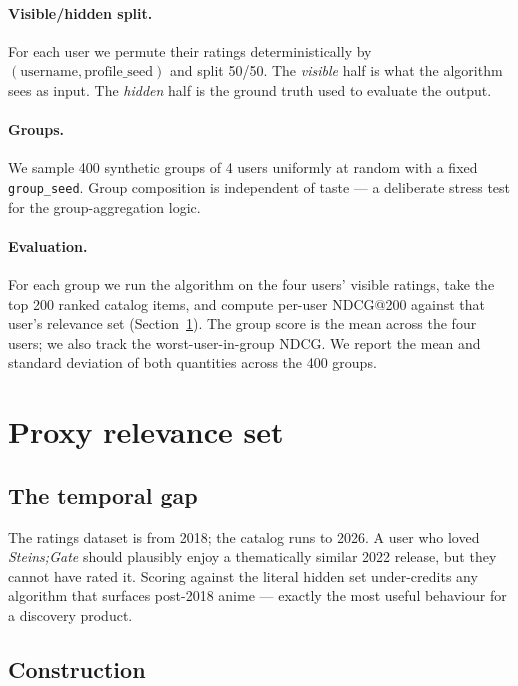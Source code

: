 \documentclass[11pt]{article}
\begin{document}
\paragraph{Visible/hidden split.}
For each user we permute their ratings deterministically by
$(\text{username}, \text{profile\_seed})$ and split 50/50. The
\emph{visible} half is what the algorithm sees as input. The
\emph{hidden} half is the ground truth used to evaluate the output.

\paragraph{Groups.}
We sample 400 synthetic groups of 4 users uniformly at random with a
fixed \texttt{group\_seed}. Group composition is independent of taste --- a
deliberate stress test for the group-aggregation logic.

\paragraph{Evaluation.}
For each group we run the algorithm on the four users' visible ratings,
take the top 200 ranked catalog items, and compute per-user NDCG@200
against that user's relevance set (Section~\ref{sec:proxy}). The group
score is the mean across the four users; we also track the
worst-user-in-group NDCG. We report the mean and standard deviation of
both quantities across the 400 groups.

\section{Proxy relevance set}
\label{sec:proxy}

\subsection{The temporal gap}

The ratings dataset is from 2018; the catalog runs to 2026. A user who
loved \emph{Steins;Gate} should plausibly enjoy a thematically similar
2022 release, but they cannot have rated it. Scoring against the literal
hidden set under-credits any algorithm that surfaces post-2018 anime ---
exactly the most useful behaviour for a discovery product.

\subsection{Construction}
\end{document}
